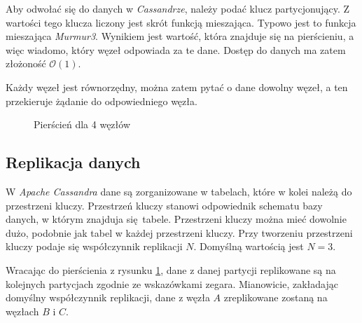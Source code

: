 \documentclass[oneside, 11pt, a4paper]{article}
\begin{document}
\begin{multicols}{2}
Aby odwołać się do danych w \emph{Cassandrze}, należy podać klucz partycjonujący. Z wartości tego klucza liczony jest skrót funkcją mieszająca. Typowo jest to funkcja mieszająca \emph{Murmur3}. Wynikiem jest wartość, która znajduje się na pierścieniu, a więc wiadomo, który węzeł odpowiada za te dane. Dostęp do danych ma zatem złożoność $\mathcal{O}(1)$.

Każdy węzeł jest równorzędny, można zatem pytać o dane dowolny węzeł, a ten przekieruje żądanie do odpowiedniego węzła.


 \begin{figure}[H]
 \centering
  \begin{center}
  \captionsetup{justification=centering}
  \vspace{-3mm}
  \caption{Pierścień dla 4 węzłów}
  \label{fig:ring}
  \end{center}
  
\end{figure}
\vspace{-10mm}

\subsection{Replikacja danych}
W \emph{Apache Cassandra} dane są zorganizowane w tabelach, które w kolei należą do przestrzeni kluczy. Przestrzeń kluczy stanowi odpowiednik schematu bazy danych, w którym znajduja się tabele. Przestrzeni kluczy można mieć dowolnie dużo, podobnie jak tabel w każdej przestrzeni kluczy. Przy tworzeniu przestrzeni kluczy podaje się współczynnik replikacji $N$. Domyślną wartością jest $N=3$. 

Wracając do pierścienia z rysunku \ref{fig:ring}, dane z danej partycji replikowane są na kolejnych partycjach zgodnie ze wskazówkami zegara. Mianowicie, zakładając domyślny współczynnik replikacji, dane z węzła $A$ zreplikowane zostaną na węzłach $B$ i $C$. 


\end{multicols}
\end{document}
